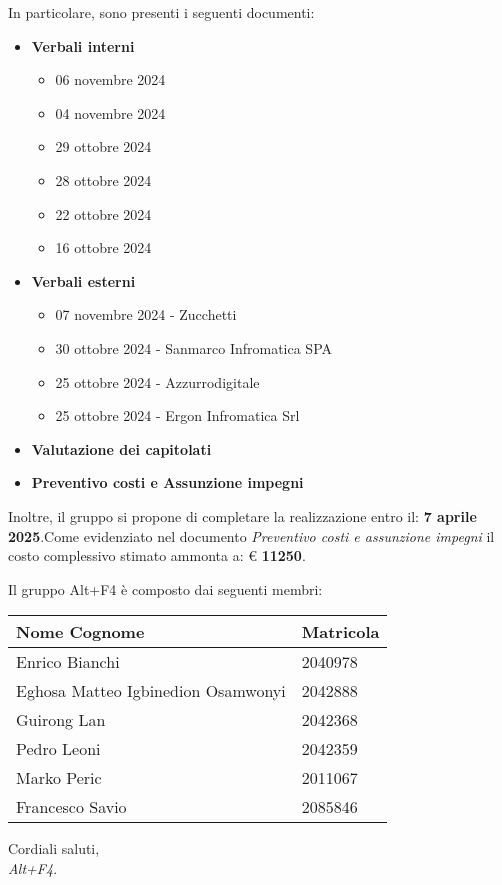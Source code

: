 \documentclass[a4paper, 12pt]{article}
\begin{document}
In particolare, sono presenti i seguenti documenti:
\begin{itemize}
    \item \textbf{Verbali interni}
    \begin{itemize} %
        \item 06 novembre 2024
        \item 04 novembre 2024
        \item 29 ottobre 2024
        \item 28 ottobre 2024
        \item 22 ottobre 2024
        \item 16 ottobre 2024
    \end{itemize}
    \item \textbf{Verbali esterni}
    \begin{itemize} 
        \item 07 novembre 2024 - Zucchetti
        \item 30 ottobre 2024 - Sanmarco Infromatica SPA
        \item 25 ottobre 2024 - Azzurrodigitale
        \item 25 ottobre 2024 - Ergon Infromatica Srl
    \end{itemize}
    \item \textbf{Valutazione dei capitolati}
    \item \textbf{Preventivo costi e Assunzione impegni}
\end{itemize}
Inoltre, il gruppo si propone di completare la realizzazione entro il:
\textbf{7 aprile 2025}.Come evidenziato nel documento \textit{Preventivo costi e assunzione impegni} il costo complessivo stimato ammonta a: € \textbf{11250}.\\

\newpage

Il gruppo Alt+F4 è composto dai seguenti membri:
\begin{table}[h]
    {\renewcommand{\arraystretch}{2}
    \begin{tabularx}{\textwidth}{| X | X |}
        \hline
            \textbf{\large Nome Cognome} & 
            \textbf{\large Matricola} \\
        \hline 
        \hline
            Enrico Bianchi&
            2040978 \\
        \hline 
            Eghosa Matteo Igbinedion Osamwonyi&
            2042888 \\
        \hline 
            Guirong Lan&
            2042368 \\
        \hline 
            Pedro Leoni&
            2042359 \\
        \hline 
            Marko Peric&
            2011067 \\
        \hline 
            Francesco Savio&
            2085846 \\
        \hline 
    
\end{tabularx}}
\newline
\newline
\newline
\newline
Cordiali saluti,\\
\textit{Alt+F4}.
\end{table}
\end{document}
